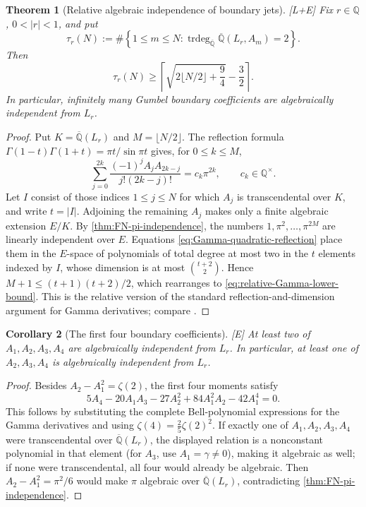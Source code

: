 \documentclass[11pt]{article}
\newtheorem{theorem}{Theorem}[section]
\newtheorem{corollary}[theorem]{Corollary}
\theoremstyle{definition}
\theoremstyle{remark}
\newcommand{\status}[1]{\textnormal{\textcolor{accent}{\footnotesize[#1]}}}
\begin{document}
\begin{theorem}[Relative algebraic independence of boundary jets]
\label{thm:relative-Gamma-jets}
\status{L+E}
Fix $r\in\mathbb Q$, $0<|r|<1$, and put
\[
 \tau_r(N):=\#\left\{1\le m\le N:
 \operatorname{trdeg}_{\overline{\mathbb Q}}
 \overline{\mathbb Q}(L_r,A_m)=2\right\}.
\]
Then
\begin{equation}\label{eq:relative-Gamma-lower-bound}
 \tau_r(N)\ge
 \left\lceil\sqrt{2\lfloor N/2\rfloor+\frac94}-\frac32\right\rceil.
\end{equation}
In particular, infinitely many Gumbel boundary coefficients are algebraically independent
from $L_r$.
\end{theorem}

\begin{proof}
Put $K=\overline{\mathbb Q}(L_r)$ and $M=\lfloor N/2\rfloor$.  The reflection
formula $\Gamma(1-t)\Gamma(1+t)=\pi t/\sin\pi t$ gives, for $0\le k\le M$,
\begin{equation}\label{eq:Gamma-quadratic-reflection}
 \sum_{j=0}^{2k}\frac{(-1)^jA_jA_{2k-j}}{j!(2k-j)!}
 =c_k\pi^{2k},\qquad c_k\in\mathbb Q^\times.
\end{equation}
Let $I$ consist of those indices $1\le j\le N$ for which $A_j$ is transcendental
over $K$, and write $t=|I|$.  Adjoining the remaining $A_j$ makes only a finite
algebraic extension $E/K$.  By \cref{thm:FN-pi-independence}, the numbers
$1,\pi^2,\ldots,\pi^{2M}$ are linearly independent over $E$.
Equations \eqref{eq:Gamma-quadratic-reflection} place them in the $E$-space of
polynomials of total degree at most two in the $t$ elements indexed by $I$, whose
dimension is at most $\binom{t+2}{2}$.  Hence
$M+1\le(t+1)(t+2)/2$, which rearranges to
\eqref{eq:relative-Gamma-lower-bound}.  This is the relative version of the standard
reflection-and-dimension argument for Gamma derivatives; compare \cite{PowersGamma}.
\end{proof}

\begin{corollary}[The first four boundary coefficients]
\label{cor:first-four-relative-Gamma}
\status{E}
At least two of $A_1,A_2,A_3,A_4$ are algebraically independent from $L_r$.
In particular, at least one of $A_2,A_3,A_4$ is algebraically independent from $L_r$.
\end{corollary}

\begin{proof}
Besides $A_2-A_1^2=\zeta(2)$, the first four moments satisfy
\[
 5A_4-20A_1A_3-27A_2^2+84A_1^2A_2-42A_1^4=0.
\]
This follows by substituting the complete Bell-polynomial expressions for the Gamma
derivatives and using $\zeta(4)=\tfrac25\zeta(2)^2$.  If exactly one of
$A_1,A_2,A_3,A_4$ were transcendental over $\overline{\mathbb Q}(L_r)$, the displayed
relation is a nonconstant polynomial in that element (for $A_3$, use
$A_1=\gamma\ne0$), making it algebraic as well; if none were transcendental, all four
would already be algebraic.  Then $A_2-A_1^2=\pi^2/6$ would make $\pi$ algebraic over
$\overline{\mathbb Q}(L_r)$, contradicting \cref{thm:FN-pi-independence}.
\end{proof}
\end{document}
